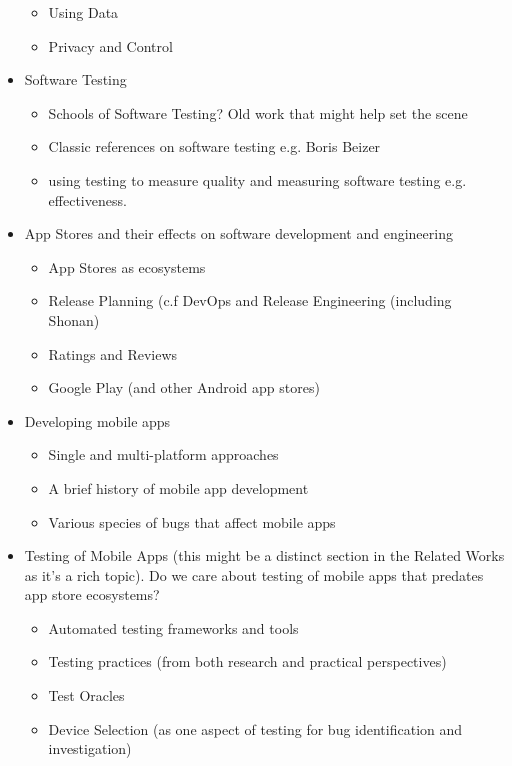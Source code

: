 \begin{itemize}
\begin{itemize}
\begin{itemize}
        \end{itemize}
        \item Using Data
        \item Privacy and Control
    \end{itemize}
    \item Software Testing
    \begin{itemize}
        \item Schools of Software Testing? Old work that might help set the scene
        \item Classic references on software testing e.g. Boris Beizer
        \item using testing to measure quality and measuring software testing e.g. effectiveness.
    \end{itemize}
    \item App Stores and their effects on software development and engineering
    \begin{itemize}
        \item App Stores as ecosystems
        \item Release Planning (c.f DevOps and Release Engineering (including Shonan)
        \item Ratings and Reviews
        \item Google Play (and other Android app stores)
    \end{itemize}
    \item Developing mobile apps
    \begin{itemize}
        \item Single and multi-platform approaches
        \item A brief history of mobile app development
        \item Various species of bugs that affect mobile apps
    \end{itemize}
    \item Testing of Mobile Apps (this might be a distinct section in the Related Works as it's a rich topic). Do we care about testing of mobile apps that predates app store ecosystems?
    \begin{itemize}
        \item Automated testing frameworks and tools
        \item Testing practices (from both research and practical perspectives)
        \item Test Oracles
        \item Device Selection (as one aspect of testing for bug identification and investigation)

\end{itemize}
\end{itemize}
